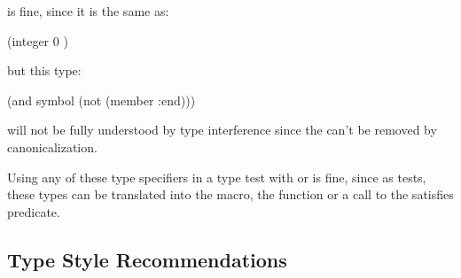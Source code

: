 is fine, since it is the same as:

\begin{example}
(integer 0 )
\end{example}

but this type:

\begin{example}
(and symbol (not (member :end)))
\end{example}

will not be fully understood by type interference since the 
can't be removed by canonicalization.

Using any of these type specifiers in a type test with  or
 is fine, since as tests, these types can be translated
into the  macro, the  function or a call to the
satisfies predicate.


\subsection{Type Style Recommendations}

